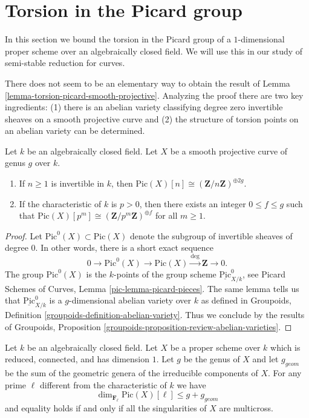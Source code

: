 \section{Torsion in the Picard group}
\label{section-torsion-in-pic}

\noindent
In this section we bound the torsion in the Picard group of a $1$-dimensional
proper scheme over an algebraically closed field. We will use this in our
study of semi-stable reduction for curves.

\medskip\noindent
There does not seem to be an elementary way to obtain the result of
Lemma \ref{lemma-torsion-picard-smooth-projective}.
Analyzing the proof there are two key ingredients:
(1) there is an abelian variety classifying degree zero invertible sheaves on
a smooth projective curve and (2) the structure of torsion points on
an abelian variety can be determined.

\begin{lemma}
\label{lemma-torsion-picard-smooth-projective}
Let $k$ be an algebraically closed field.
Let $X$ be a smooth projective curve of genus $g$ over $k$.
\begin{enumerate}
\item If $n \geq 1$ is invertible in $k$, then
$\text{Pic}(X)[n] \cong (\mathbf{Z}/n\mathbf{Z})^{\oplus 2g}$.
\item If the characteristic of $k$ is $p > 0$, then there exists
an integer $0 \leq f \leq g$ such that
$\text{Pic}(X)[p^m] \cong (\mathbf{Z}/p^m\mathbf{Z})^{\oplus f}$ for
all $m \geq 1$.
\end{enumerate}
\end{lemma}

\begin{proof}
Let $\text{Pic}^0(X) \subset \text{Pic}(X)$
denote the subgroup of invertible sheaves of degree $0$.
In other words, there is a short exact sequence
$$
0 \to \text{Pic}^0(X) \to \text{Pic}(X) \xrightarrow{\deg} \mathbf{Z} \to 0.
$$
The group $\text{Pic}^0(X)$ is the $k$-points of
the group scheme $\underline{\text{Pic}}^0_{X/k}$, see
Picard Schemes of Curves, Lemma \ref{pic-lemma-picard-pieces}.
The same lemma tells us that $\underline{\text{Pic}}^0_{X/k}$
is a $g$-dimensional abelian variety over $k$ as defined in
Groupoids, Definition \ref{groupoids-definition-abelian-variety}.
Thus we conclude by the results of
Groupoids, Proposition \ref{groupoids-proposition-review-abelian-varieties}.
\end{proof}

\begin{proposition}
\label{proposition-torsion-picard-reduced-proper}
Let $k$ be an algebraically closed field. Let $X$ be a proper scheme over $k$
which is reduced, connected, and has dimension $1$. Let $g$ be the genus
of $X$ and let $g_{geom}$ be the sum of the geometric genera of the
irreducible components of $X$. For any prime $\ell$ different from
the characteristic of $k$ we have
$$
\dim_{\mathbf{F}_\ell} \text{Pic}(X)[\ell]
\leq g + g_{geom}
$$
and equality holds if and only if all the singularities of $X$
are multicross.
\end{proposition}

